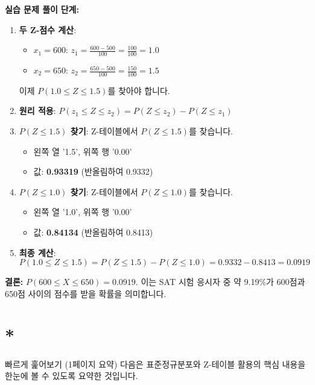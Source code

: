 \documentclass[11pt,a4paper]{article}
\theoremstyle{definition}
\newcommand{\newsection}[1]{\newpage\section{#1}}
\begin{document}
\begin{examplebox}
\textbf{실습 문제 풀이}
\textbf{단계:}
\begin{enumerate}
    \item \textbf{두 Z-점수 계산}:
    \begin{itemize}
        \item $x_1 = 600$: $z_1 = \frac{600 - 500}{100} = \frac{100}{100} = 1.0$
        \item $x_2 = 650$: $z_2 = \frac{650 - 500}{100} = \frac{150}{100} = 1.5$
    \end{itemize}
    이제 $P(1.0 \le Z \le 1.5)$를 찾아야 합니다.
    \item \textbf{원리 적용}: $P(z_1 \le Z \le z_2) = P(Z \le z_2) - P(Z \le z_1)$
    \item \textbf{$P(Z \le 1.5)$ 찾기}: Z-테이블에서 $P(Z \le 1.5)$를 찾습니다.
    \begin{itemize}
        \item 왼쪽 열 '1.5', 위쪽 행 '0.00'
        \item 값: \textbf{0.93319} (반올림하여 0.9332)
    \end{itemize}
    \item \textbf{$P(Z \le 1.0)$ 찾기}: Z-테이블에서 $P(Z \le 1.0)$를 찾습니다.
    \begin{itemize}
        \item 왼쪽 열 '1.0', 위쪽 행 '0.00'
        \item 값: \textbf{0.84134} (반올림하여 0.8413)
    \end{itemize}
    \item \textbf{최종 계산}:
    \[ P(1.0 \le Z \le 1.5) = P(Z \le 1.5) - P(Z \le 1.0) = 0.9332 - 0.8413 = 0.0919 \]
\end{enumerate}
\textbf{결론:} $P(600 \le X \le 650) = 0.0919$. 이는 SAT 시험 응시자 중 약 9.19\%가 600점과 650점 사이의 점수를 받을 확률을 의미합니다.
\end{examplebox}

\newsection*{빠르게 훑어보기 (1페이지 요약)}
다음은 표준정규분포와 Z-테이블 활용의 핵심 내용을 한눈에 볼 수 있도록 요약한 것입니다.
\end{document}
